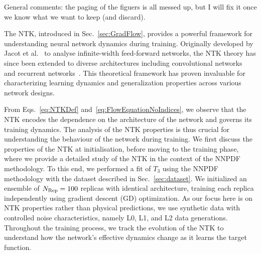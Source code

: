 \ac{General comments: the paging of the figuers is all messed up, but I will fix
it once we know what we want to keep (and discard).} 

The NTK, introduced in Sec.~\ref{sec:GradFlow}, provides a powerful framework for understanding neural
network dynamics during training. Originally developed by Jacot et
al.~\cite{jacot2018neural} to analyse infinite-width feed-forward networks, the
NTK theory has since been extended to diverse architectures including
convolutional networks~\cite{arora2019exact} and recurrent
networks~\cite{alemohammad2021recurrent}. This theoretical framework has proven
invaluable for characterizing learning dynamics and generalization properties
across various network designs.

From Eqs.~\eqref{eq:NTKDef} and~\eqref{eq:FlowEquationNoIndices}, we observe that the NTK encodes the
dependence on the architecture of the network and governs its training dynamics.
The analysis of the NTK properties is thus crucial for understanding the 
behaviour of the network during training. We first discuss the properties of the NTK at
initialisation, before moving to the training phase, where we provide a detailed
study of the NTK in the context of the NNPDF methodology. To this end, we
performed a fit of $T_3$ using the NNPDF methodology with the dataset described
in Sec.~\ref{sec:dataset}. We initialized an ensemble of $N_{\rm Rep} = 100$ replicas with
identical architecture, training each replica independently using gradient
descent (GD) optimization. As our focus here is on NTK properties rather than
physical predictions, we use synthetic data with controlled noise
characteristics, namely L0, L1, and L2 data generations. Throughout the training process, 
we track the evolution of the NTK to understand how the network's effective
dynamics change as it learns the target function.


